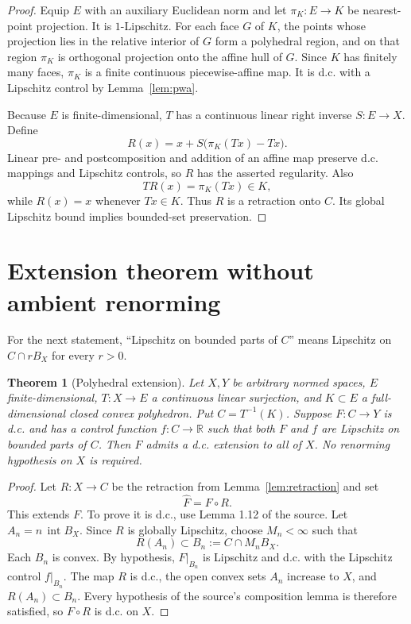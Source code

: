 \documentclass[11pt]{article}
\newtheorem{theorem}{Theorem}
\newcommand{\R}{\mathbb R}
\begin{document}
\begin{proof}
Equip $E$ with an auxiliary Euclidean norm and let
$\pi_K:E\to K$ be nearest-point projection. It is $1$-Lipschitz. For
each face $G$ of $K$, the points whose projection lies in the relative
interior of $G$ form a polyhedral region, and on that region $\pi_K$ is
orthogonal projection onto the affine hull of $G$. Since $K$ has finitely
many faces, $\pi_K$ is a finite continuous piecewise-affine map. It is d.c.
with a Lipschitz control by Lemma~\ref{lem:pwa}.

Because $E$ is finite-dimensional, $T$ has a continuous linear right
inverse $S:E\to X$. Define
\[
 R(x)=x+S\bigl(\pi_K(Tx)-Tx\bigr).                           \tag{1}\label{eq:R}
\]
Linear pre- and postcomposition and addition of an affine map preserve d.c.
mappings and Lipschitz controls, so $R$ has the asserted regularity. Also
\[
 TR(x)=\pi_K(Tx)\in K,
\]
while $R(x)=x$ whenever $Tx\in K$. Thus $R$ is a retraction onto $C$.
Its global Lipschitz bound implies bounded-set preservation.
\end{proof}

\section{Extension theorem without ambient renorming}

For the next statement, “Lipschitz on bounded parts of $C$” means Lipschitz
on $C\cap rB_X$ for every $r>0$.

\begin{theorem}[Polyhedral extension]\label{thm:main}
Let $X,Y$ be arbitrary normed spaces, $E$ finite-dimensional,
$T:X\to E$ a continuous linear surjection, and $K\subset E$ a
full-dimensional closed convex polyhedron. Put $C=T^{-1}(K)$. Suppose
$F:C\to Y$ is d.c. and has a control function $f:C\to\R$ such that both
$F$ and $f$ are Lipschitz on bounded parts of $C$. Then $F$ admits a
d.c. extension to all of $X$. No renorming hypothesis on $X$ is required.
\end{theorem}

\begin{proof}
Let $R:X\to C$ be the retraction from Lemma~\ref{lem:retraction} and set
\[
 \widehat F=F\circ R.
\]
This extends $F$. To prove it is d.c., use Lemma 1.12 of the source. Let
$A_n=n\,\operatorname{int}B_X$. Since $R$ is globally Lipschitz, choose
$M_n<\infty$ such that
\[
 R(A_n)\subset B_n:=C\cap M_nB_X.
\]
Each $B_n$ is convex. By hypothesis, $F|_{B_n}$ is Lipschitz and d.c. with
the Lipschitz control $f|_{B_n}$. The map $R$ is d.c., the open convex
sets $A_n$ increase to $X$, and $R(A_n)\subset B_n$. Every hypothesis
of the source's composition lemma is therefore satisfied, so $F\circ R$ is
d.c. on $X$.
\end{proof}
\end{document}

